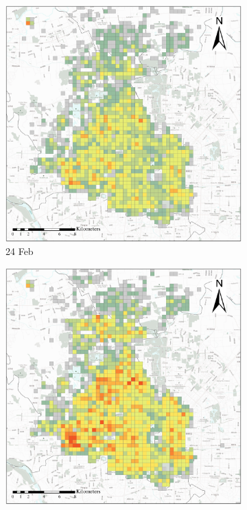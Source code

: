 \documentclass[preprints,article,accept,moreauthors,pdftex]{Definitions/mdpi}
\begin{document}
\begin{figure}[ht]
    \vspace{6pt}
    \begin{subfigure}{.23\textwidth}
        \includegraphics[width=\textwidth]{Figures/Overall_spatial_patterns/FN5_D2020_02_22.eps}
        \caption{24 Feb}
    \end{subfigure}
    \begin{subfigure}{.23\textwidth}
        \includegraphics[width=\textwidth]{Figures/Overall_spatial_patterns/FN5_D2020_02_26.eps}

\end{subfigure}
\end{figure}
\end{document}
